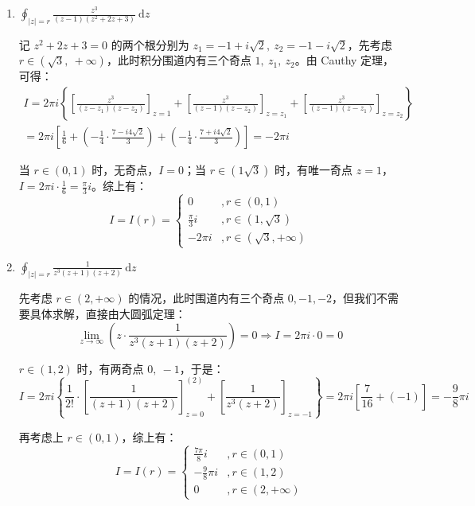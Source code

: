 \documentclass[UTF8]{report}
\theoremstyle{MyLineTheoremStyle} %
\theoremstyle{MyBlockTheoremStyle} %
\theoremstyle{MySubsubsectionStyle} %
\begin{document}
\begin{enumerate}
\item $\displaystyle \oint_{| z | = r} \frac{z^3}{(z - 1)(z^2 + 2z +3)} \ \mathrm{d}z $

记 $z^2 + 2z + 3 = 0$ 的两个根分别为 $z_1 = -1 + i\sqrt{2} ,\ z_2 = -1 - i\sqrt{2} $，先考虑 $r \in (\sqrt{3},\ +\infty)$，此时积分围道内有三个奇点 $1,\ z_1,\ z_2$。由 Cauthy 定理，可得：
\begin{gather}
I = 2 \pi i \left\{ \left[\frac{z^3}{(z - z_1)(z - z_2)}\right]_{z = 1} + \left[\frac{z^3}{(z - 1)(z - z_2)}\right]_{z = z_1} + \left[\frac{z^3}{(z - 1)(z - z_1)}\right]_{z = z_2}  \right\} \\ 
= 2 \pi i \left[ \frac{1}{6} + \left( -\frac{1}{4}\cdot \frac{7 - i4 \sqrt{2} }{3} \right) + \left( -\frac{1}{4}\cdot \frac{7 + i4 \sqrt{2} }{3} \right)  \right] = - 2\pi i
\end{gather}

当 $r \in (0, 1)$ 时，无奇点，$I = 0$；当 $r \in (1 \sqrt{3} )$ 时，有唯一奇点 $z =1$，$I = 2 \pi i \cdot \frac{1}{6} = \frac{\pi}{3}i$。综上有：
\begin{equation}
I = I(r) = 
\begin{cases}
    0 &, r \in (0, 1) \\ 
    \displaystyle \frac{\pi}{3}i &, r \in (1, \sqrt{3}) \\ 
    -2\pi i &, r \in (\sqrt{3}, +\infty)
\end{cases}
\end{equation}

\item $\displaystyle \oint_{| z | = r} \frac{1}{z^3(z + 1)(z + 2)}  \ \mathrm{d}z $

先考虑 $r \in (2 , +\infty)$ 的情况，此时围道内有三个奇点 $0, -1, -2$，但我们不需要具体求解，直接由大圆弧定理：
\begin{equation}
\lim_{z \to \infty}  \left(z \cdot  \frac{1}{z^3(z + 1)(z + 2)} \right) = 0  \Longrightarrow I = 2 \pi i \cdot 0 = 0
\end{equation}

$r \in (1 ,2)$ 时，有两奇点 $0,\ -1$，于是：
\begin{equation}
I = 2 \pi i \left\{ \frac{1}{2!}\cdot \left[ \frac{1}{(z + 1)(z + 2)} \right]^{(2)}_{z = 0} + \left[ \frac{1}{z^3(z + 2)} \right]_{z = -1}\right\} = 2 \pi i \left[ \frac{7}{16} + (-1) \right] = -\frac{9}{8} \pi i
\end{equation}

再考虑上 $r \in (0, 1)$，综上有：
\begin{equation}
I = I(r) = 
\begin{cases}
    \displaystyle \frac{7 \pi }{8} i &, r \in (0, 1) \\ 
    \displaystyle -\frac{9}{8} \pi i &, r \in (1, 2) \\ 
    0 &, r \in (2, +\infty)
\end{cases}
\end{equation}

\end{enumerate}
\end{document}
